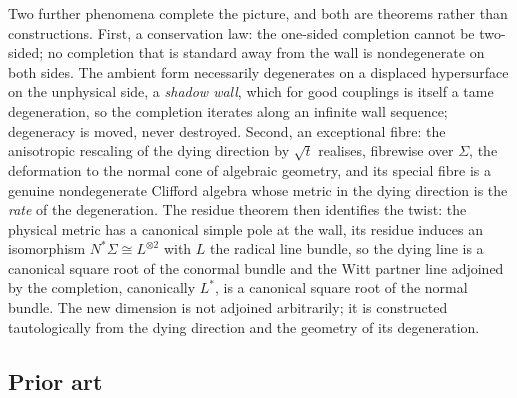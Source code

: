 \documentclass[11pt]{article}
\theoremstyle{definition}
\newcommand{\shL}{L}
\newcommand{\Sig}{\Sigma}
\begin{document}
Two further phenomena complete the picture, and both are theorems rather than constructions. First, a conservation law: the one-sided completion cannot be two-sided; no completion that is standard away from the wall is nondegenerate on both sides. The ambient form necessarily degenerates on a displaced hypersurface on the unphysical side, a \emph{shadow wall}, which for good couplings is itself a tame degeneration, so the completion iterates along an infinite wall sequence; degeneracy is moved, never destroyed. Second, an exceptional fibre: the anisotropic rescaling of the dying direction by $\sqrt{t}$ realises, fibrewise over $\Sig$, the deformation to the normal cone of algebraic geometry, and its special fibre is a genuine nondegenerate Clifford algebra whose metric in the dying direction is the \emph{rate} of the degeneration. The residue theorem then identifies the twist: the physical metric has a canonical simple pole at the wall, its residue induces an isomorphism $N^*\Sig \cong \shL^{\otimes 2}$ with $\shL$ the radical line bundle, so the dying line is a canonical square root of the conormal bundle and the Witt partner line adjoined by the completion, canonically $\shL^*$, is a canonical square root of the normal bundle. The new dimension is not adjoined arbitrarily; it is constructed tautologically from the dying direction and the geometry of its degeneration.

\subsection*{Prior art}
\end{document}
